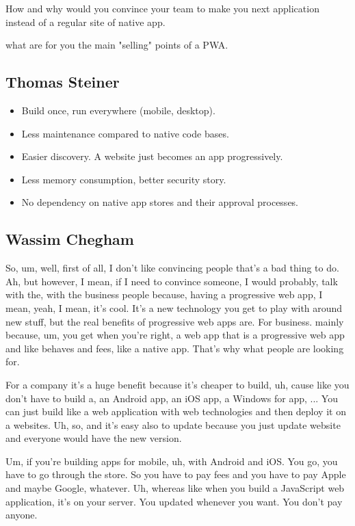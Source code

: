 		How and why would you convince your team to make you next application instead of a regular site of native app.
		
		what are for you the main "selling" points of a PWA.
		
		\subsection{Thomas Steiner}
			\begin{itemize}
				\item Build once, run everywhere (mobile, desktop).
				\item Less maintenance compared to native code bases.
				\item Easier discovery. A website just becomes an app progressively.
				\item Less memory consumption, better security story.
				\item No dependency on native app stores and their approval processes.

			\end{itemize} 
	
		\subsection{Wassim Chegham}
			So, um, well, first of all, I don't like convincing people that's a bad thing to do. Ah, but however, I mean, if I need to convince someone, I would probably, talk with the, with the business people because, having a progressive web app, I mean, yeah, I mean, it's cool. It's a new technology you get to play with around new stuff, but the real benefits of progressive web apps are. For business. mainly because, um, you get when you're right, a web app that is a progressive web app and like behaves and fees, like a native app. That's why what people are looking for.
			
			For a company it's a huge benefit because it's cheaper to build, uh, cause like you don't have to build a, an Android app, an iOS app, a Windows for app, ... You can just build like a web application with web technologies and then deploy it on a websites. Uh, so, and it's easy also to update because you just update website and everyone would have the new version.
			
			Um, if you're building apps for mobile, uh, with Android and iOS. You go, you have to go through the store. So you have to pay fees and you have to pay Apple and maybe Google, whatever. Uh, whereas like when you build a JavaScript web application, it's on your server. You updated whenever you want. You don't pay anyone. 
			
